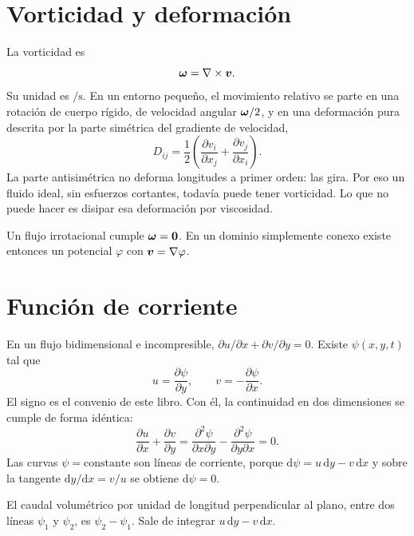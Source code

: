 \section{Vorticidad y deformación}

La vorticidad es
\begin{equation}
\label{eq:vorticidad}
\boldsymbol{\omega}=\nabla\times\boldsymbol{v}.
\end{equation}
Su unidad es \(\si{\per\second}\). En un entorno pequeño, el movimiento relativo se parte en una rotación de cuerpo rígido, de velocidad angular \(\boldsymbol{\omega}/2\), y en una deformación pura descrita por la parte simétrica del gradiente de velocidad,
\begin{equation}
\label{eq:tensor-d}
D_{ij}=\frac12\left(\frac{\partial v_i}{\partial x_j}+\frac{\partial v_j}{\partial x_i}\right).
\end{equation}
La parte antisimétrica no deforma longitudes a primer orden: las gira. Por eso un fluido ideal, sin esfuerzos cortantes, todavía puede tener vorticidad. Lo que no puede hacer es disipar esa deformación por viscosidad.

Un flujo irrotacional cumple \(\boldsymbol{\omega}=\boldsymbol{0}\). En un dominio simplemente conexo existe entonces un potencial \(\varphi\) con \(\boldsymbol{v}=\nabla\varphi\).

\section{Función de corriente}

En un flujo bidimensional e incompresible, \(\partial u/\partial x+\partial v/\partial y=0\). Existe \(\psi(x,y,t)\) tal que
\begin{equation}
\label{eq:psi}
u=\frac{\partial\psi}{\partial y},
\qquad
v=-\frac{\partial\psi}{\partial x}.
\end{equation}
El signo es el convenio de este libro. Con él, la continuidad en dos dimensiones se cumple de forma idéntica:
\[
\frac{\partial u}{\partial x}+\frac{\partial v}{\partial y}
=\frac{\partial^2\psi}{\partial x\partial y}-\frac{\partial^2\psi}{\partial y\partial x}=0.
\]
Las curvas \(\psi=\mathrm{constante}\) son líneas de corriente, porque \(\mathrm{d}\psi=u\,\mathrm{d}y-v\,\mathrm{d}x\) y sobre la tangente \(\mathrm{d}y/\mathrm{d}x=v/u\) se obtiene \(\mathrm{d}\psi=0\).

El caudal volumétrico por unidad de longitud perpendicular al plano, entre dos líneas \(\psi_1\) y \(\psi_2\), es \(\psi_2-\psi_1\). Sale de integrar \(u\,\mathrm{d}y-v\,\mathrm{d}x\).

